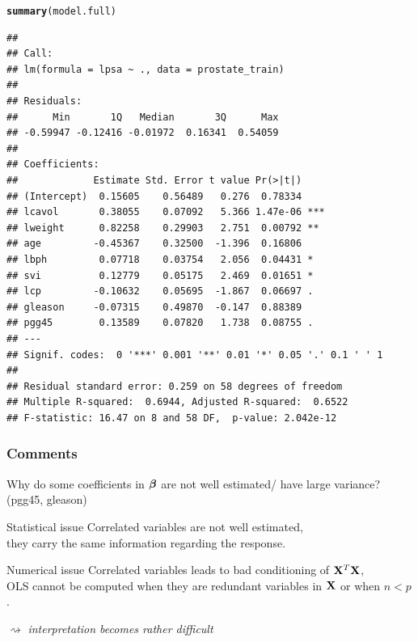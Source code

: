\documentclass[10pt, c, xcolor=x11names]{beamer}\usepackage[]{graphicx}\usepackage[]{color}
\makeatletter
\newcommand{\hlstd}[1]{\textcolor[rgb]{0.345,0.345,0.345}{#1}}%
\newcommand{\hlkwd}[1]{\textcolor[rgb]{0.737,0.353,0.396}{\textbf{#1}}}%
\newenvironment{kframe}{%
 \def\at@end@of@kframe{}%
 \ifinner\ifhmode%
  \def\at@end@of@kframe{\end{minipage}}%
  \begin{minipage}{\columnwidth}%
 \fi\fi%
 \def\FrameCommand##1{\hskip\@totalleftmargin \hskip-\fboxsep
 \colorbox{shadecolor}{##1}\hskip-\fboxsep
     \hskip-\linewidth \hskip-\@totalleftmargin \hskip\columnwidth}%
 \MakeFramed {\advance\hsize-\width
   \@totalleftmargin\z@ \linewidth\hsize
   \@setminipage}}%
 {\par\unskip\endMakeFramed%
 \at@end@of@kframe}
\newenvironment{knitrout}{}{} %
\makeatother
\begin{document}
\begin{frame}
\begin{knitrout}\tiny
{}\color{fgcolor}\begin{kframe}
\begin{alltt}
\hlkwd{summary}\hlstd{(model.full)}
\end{alltt}
\begin{verbatim}
## 
## Call:
## lm(formula = lpsa ~ ., data = prostate_train)
## 
## Residuals:
##      Min       1Q   Median       3Q      Max 
## -0.59947 -0.12416 -0.01972  0.16341  0.54059 
## 
## Coefficients:
##             Estimate Std. Error t value Pr(>|t|)    
## (Intercept)  0.15605    0.56489   0.276  0.78334    
## lcavol       0.38055    0.07092   5.366 1.47e-06 ***
## lweight      0.82258    0.29903   2.751  0.00792 ** 
## age         -0.45367    0.32500  -1.396  0.16806    
## lbph         0.07718    0.03754   2.056  0.04431 *  
## svi          0.12779    0.05175   2.469  0.01651 *  
## lcp         -0.10632    0.05695  -1.867  0.06697 .  
## gleason     -0.07315    0.49870  -0.147  0.88389    
## pgg45        0.13589    0.07820   1.738  0.08755 .  
## ---
## Signif. codes:  0 '***' 0.001 '**' 0.01 '*' 0.05 '.' 0.1 ' ' 1
## 
## Residual standard error: 0.259 on 58 degrees of freedom
## Multiple R-squared:  0.6944,	Adjusted R-squared:  0.6522 
## F-statistic: 16.47 on 8 and 58 DF,  p-value: 2.042e-12
\end{verbatim}
\end{kframe}
\end{knitrout}
\end{frame}

\begin{frame}
  \frametitle{Comments}

  Why do  some coefficients in  $\boldsymbol\beta$ are not well  estimated/ have
  large variance? (pgg45, gleason)

  \begin{block}{Statistical issue}
    \alert{Correlated variables are not well estimated},\\
    
    \rsa  they carry the same information regarding the response.

  \end{block}

  \vfill

  \begin{block}{Numerical issue}
    \alert{Correlated variables leads to bad conditioning of $\mathbf{X}^T\mathbf{X}$},\\

    \rsa OLS cannot be computed  when they are redundant variables in
      $\mathbf{X}$ \alert{or when $n<p$}.
  \end{block}
  
  $\rightsquigarrow$ \textit{interpretation becomes rather difficult}

\end{frame}
\end{document}
